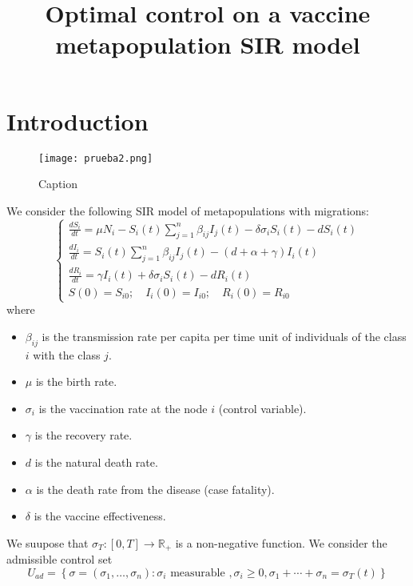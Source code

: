 \documentclass[a4paper,10pt]{article}
\title{Optimal control on a vaccine metapopulation SIR model}
\author{
}
\theoremstyle{remark}
\begin{document}
\maketitle

\begin{abstract}

\end{abstract}


\section{Introduction}
\begin{figure}
    \centering
    \texttt{[image: prueba2.png]}
    \caption{Caption}
    \label{fig:my_label}
\end{figure}



We consider the following SIR model of metapopulations with migrations:
\begin{equation}
\left\{\begin{array}{l}\frac{d S_{i}}{d t}=\mu N_{i}-S_{i}(t) \sum_{j=1}^{n} \beta_{i j} I_{j}(t)-\delta \sigma_{i} S_{i}(t)-d S_{i}(t) \\ 
\frac{d I_{i}}{d t}=S_{i}(t) \sum_{j=1}^{n} \beta_{i j} I_{j}(t)-(d+\alpha+\gamma) I_{i}(t) \\ 
\frac{d R_{i}}{d t}=\gamma I_{i}(t)+\delta \sigma_{i} S_{i}(t)-d R_{i}(t)\\
S(0)=S_{i 0};\quad I_{i}(0)=I_{i 0};\quad R_{i}(0)=R_{i 0}
\end{array}\right. 
\end{equation}
where 
\begin{itemize}
\item $\beta_{ij}$ is the transmission rate per capita per time unit of individuals of the class $i$ with the class $j$.
\item $\mu$ is the birth rate. 
\item $\sigma_{i}$ is the vaccination rate at the node $i$ (control variable).
\item $\gamma$ is the recovery rate. 
\item $d$ is the natural death rate. 
\item $\alpha$ is the death rate from the disease (case fatality). 
\item $\delta$ is the vaccine effectiveness.
\end{itemize}

\def\svgwidth{9cm}


We suupose that $\sigma_{T}:[0,T]\to\mathbb{R}_+$ is a non-negative function. We consider the admissible control set
\[U_{ad}=\left\{\sigma=\left(\sigma_{1}, \ldots, \sigma_{n}\right): \sigma_{i}\right.\text{ measurable }, \left.\sigma_{i} \geqslant 0, \sigma_{1}+\cdots+\sigma_{n}=\sigma_{T}(t)\right\}\]
\end{document}
